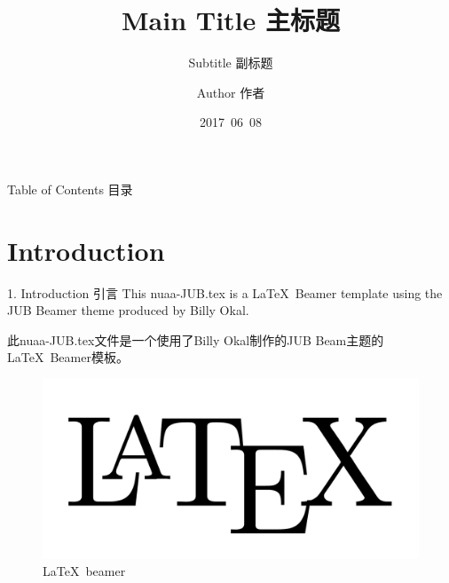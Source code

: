 \documentclass[CJKutf8]{beamer}
\begin{document}
\begin{CJK*}{UTF8}{gbsn} %

  \title{Main Title 主标题}
  \subtitle{Subtitle 副标题} %
  \author{Author 作者}
  \date{2017\ 06\ 08}

  \begin{frame}[plain,t]
    \titlepage
  \end{frame}

  \begin{frame}{Table of Contents 目录}
    \tableofcontents
  \end{frame}

  \section{Introduction}
  \label{Sec:introduction}
  \begin{frame}{1. Introduction 引言}
  This nuaa-JUB.tex is a \LaTeX \ Beamer template using the JUB Beamer theme \cite{JUBTheme} produced by Billy Okal.

  此nuaa-JUB.tex文件是一个使用了Billy Okal制作的JUB Beam主题\cite{JUBTheme}的\LaTeX \ Beamer模板。

  \begin{figure}
    \begin{center}
        \includegraphics[scale=0.1]{latex.png}
    \end{center}
    \caption{\LaTeX \ beamer}
    \label{Fig:latex_beamer}
  \end{figure}


\end{frame}
\end{CJK*}
\end{document}
